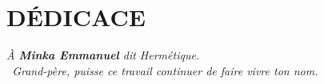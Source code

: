 
\chapter*{D\'EDICACE}
\thispagestyle{preliminaire}
\vspace*{\fill}
\begin{flushleft}
\Large
\textit{\`A \textbf{Minka Emmanuel} dit Herm\'etique.}\\
\vspace{0.3cm}
\textit{{\color{enspblue}\guillemotleft}~Grand-p\`ere, puisse ce travail continuer de faire vivre ton nom.~{\color{enspblue}\guillemotright}}
\end{flushleft}
\vspace*{\fill}
